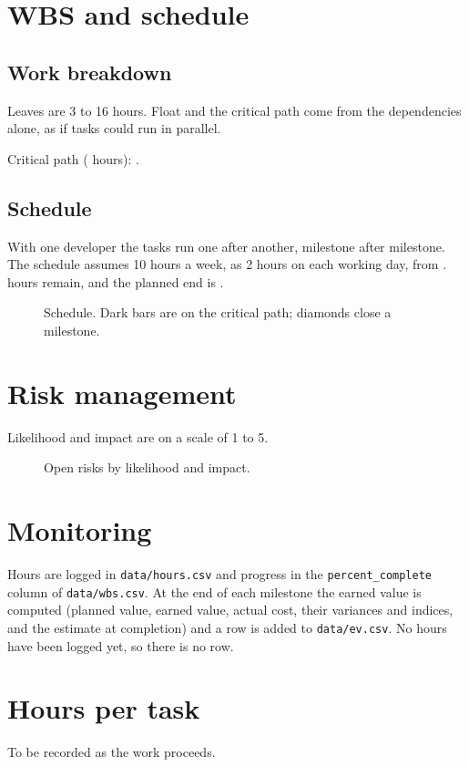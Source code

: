 \documentclass[plan]{se2doc}
\begin{document}
\section{WBS and schedule}
\subsection{Work breakdown}
Leaves are 3 to 16 hours. Float and the critical path come from the dependencies
alone, as if tasks could run in parallel.


\noindent Critical path (\plancriticalhours{} hours): \plancritical.

\subsection{Schedule}
With one developer the tasks run one after another, milestone after milestone.
The schedule assumes 10 hours a week, as 2 hours on each working day, from
\planstart. \planleft{} hours remain, and the planned end is \planend.

\begin{figure}[H]
\centering

\caption{Schedule. Dark bars are on the critical path; diamonds close a milestone.}
\end{figure}



\section{Risk management}
Likelihood and impact are on a scale of 1 to 5.

\begin{figure}[H]
\centering

\caption{Open risks by likelihood and impact.}
\end{figure}

\section{Monitoring}
Hours are logged in \texttt{data/hours.csv} and progress in the
\texttt{percent\_complete} column of \texttt{data/wbs.csv}. At the end of each
milestone the earned value is computed (planned value, earned value, actual cost,
their variances and indices, and the estimate at completion) and a row is added to
\texttt{data/ev.csv}. No hours have been logged yet, so there is no row.

\section{Hours per task}
To be recorded as the work proceeds.
\end{document}

